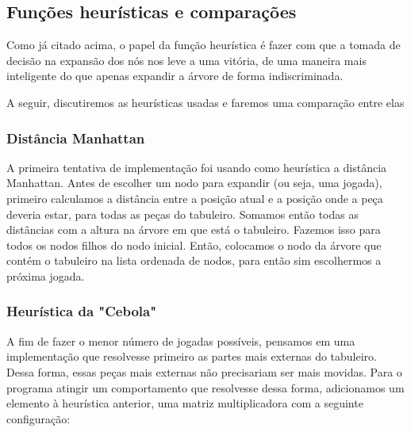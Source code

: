 \documentclass[a4paper,11pt]{article}
\begin{document}

\subsection{Funções heurísticas e comparações}
Como já citado acima, o papel da função heurística é fazer com que a tomada de
decisão na expansão dos nós nos leve a uma vitória, de uma maneira mais inteligente
do que apenas expandir a árvore de forma indiscriminada.

A seguir, discutiremos as heurísticas usadas e faremos uma comparação entre elas

\subsubsection {Distância Manhattan}
A primeira tentativa de implementação foi usando como heurística a distância Manhattan.
Antes de escolher um nodo para expandir (ou seja, uma jogada), primeiro calculamos a distância entre a
posição atual e a posição onde a peça deveria estar, para todas as peças do tabuleiro. Somamos então todas as distâncias com a altura
na árvore em que está o tabuleiro. Fazemos isso para todos os nodos filhos do nodo inicial.
Então, colocamos o nodo da árvore que contém o tabuleiro na lista ordenada de nodos, para então sim escolhermos a próxima jogada.

\subsubsection {Heurística da "Cebola"}
A fim de fazer o menor número de jogadas possíveis, pensamos em uma implementação que resolvesse primeiro as partes mais externas do tabuleiro.
Dessa forma, essas peças mais externas não precisariam ser mais movidas. Para o programa atingir um comportamento que resolvesse dessa forma,
adicionamos um elemento à heurística anterior, uma matriz multiplicadora com a seguinte configuração:
\end{document}
